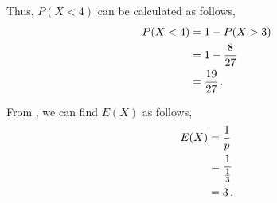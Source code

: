 \begin{subquestions}
\begin{subsubquestions}
\begin{subsubsubquestions}
Thus, $P(X<4)$ can be calculated as follows,
\begin{align}
	P(X < 4) & = 1 - P(X > 3) \nonumber \\
	         & = 1 - \frac{8}{27} \nonumber \\
	         & = \frac{19}{27} \,.
\end{align}

\end{subsubsubquestions}


\subsubquestion

From , we can find $E(X)$ as follows,
\begin{align}
	E(X) & = \frac{1}{p} \nonumber \\
	     & = \frac{1}{\frac{1}{3}} \nonumber \\
	     & = 3 \,.
\end{align}


\end{subsubquestions}

\end{subquestions}
